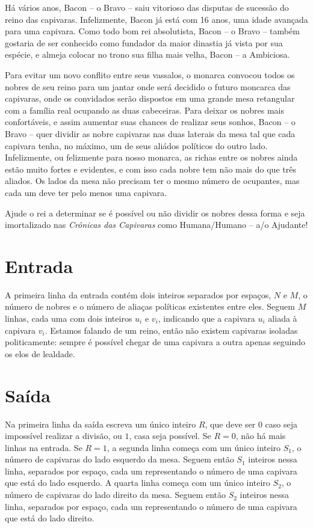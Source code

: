 Há vários anos, Bacon -- o Bravo -- saiu vitorioso das disputas de sucessão do reino das capivaras.
Infelizmente, Bacon já está com 16 anos, uma idade avançada para uma capivara.
Como todo bom rei absolutista, Bacon -- o Bravo -- também gostaria de ser conhecido como fundador
da maior dinastia já vista por sua espécie, e almeja colocar no trono sua filha mais velha,
Bacon -- a Ambiciosa.

Para evitar um novo conflito entre seus vassalos, o monarca convocou todos os nobres de seu reino
para um jantar onde será decidido o futuro moncarca das capivaras, onde os convidados serão dispostos em uma
grande mesa retangular com a família real ocupando as duas cabeceiras.
Para deixar os nobres mais confortáveis, e assim aumentar suas chances de realizar seus sonhos,
Bacon -- o Bravo -- quer dividir as nobre capivaras nas duas laterais da mesa tal que cada capivara tenha,
no máximo, um de seus aliádos políticos do outro lado.
Infelizmente, ou felizmente para nosso monarca, as richas entre os nobres ainda estão muito fortes e evidentes,
e com isso cada nobre tem não mais do que três aliados.
Os lados da mesa não precisam ter o mesmo número de ocupantes, mas cada um deve ter pelo menos uma capivara.

Ajude o rei a determinar se é possível ou não dividir os nobres dessa forma e seja imortalizado nas 
\textit{Crônicas das Capivaras} como Humana/Humano -- a/o Ajudante!

\section*{Entrada}

A primeira linha da entrada contém dois inteiros separados por espaços, $N$ e $M$, o número de nobres e o número
de aliaças políticas existentes entre eles.
Seguem $M$ linhas, cada uma com dois inteiros $u_i$ e $v_i$, indicando que a capivara $u_i$ aliada à capivara $v_i$.
Estamos falando de um reino, então não existem capivaras isoladas politicamente: sempre é possível chegar de uma capivara
a outra apenas seguindo os elos de lealdade.

\section*{Saída}

Na primeira linha da saída escreva um único inteiro $R$, que deve ser $0$ caso seja impossível realizar a divisão,
ou $1$, casa seja possível.
Se $R = 0$, não há mais linhas na entrada.
Se $R = 1$, a segunda linha começa com um único inteiro $S_1$, o número de capivaras do lado esquerdo da mesa.
Seguem então $S_1$ inteiros nessa linha, separados por espaço, cada um representando o número de uma capivara que está do lado esquerdo.
A quarta linha começa com um único inteiro $S_2$, o número de capivaras do lado direito da mesa.
Seguem então $S_2$ inteiros nessa linha, separados por espaço, cada um representando o número de uma capivara que está do lado direito.


